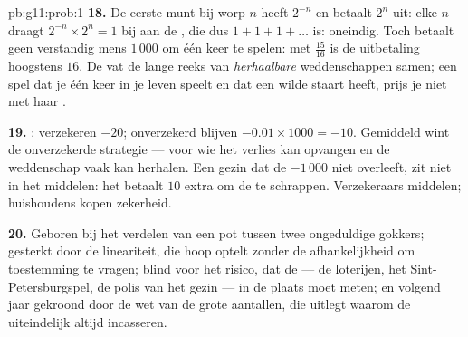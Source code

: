 \begin{solution}{pb:g11:prob:1}
\textbf{18.} De eerste munt bij worp $n$ heeft  $2^{-n}$ en betaalt
$2^n$ uit: elke $n$ draagt $2^{-n} \times 2^n = 1$ bij aan de
, die dus $1 + 1 + 1 + \dots$ is: oneindig. Toch betaalt
geen verstandig mens $1\,000$ om één keer te spelen: met 
$\frac{15}{16}$ is de uitbetaling hoogstens $16$. De  vat
de lange reeks van \emph{herhaalbare} weddenschappen samen; een spel dat je
één keer in je leven speelt en dat een wilde staart heeft, prijs je niet met
haar .

\textbf{19.} : verzekeren $-20$; onverzekerd blijven
$-0.01 \times 1000 = -10$. Gemiddeld wint de onverzekerde strategie --- voor
wie het verlies kan opvangen en de weddenschap vaak kan herhalen. Een gezin
dat de $-1\,000$ niet overleeft, zit niet in het middelen: het betaalt $10$
extra om de  te schrappen. Verzekeraars middelen; huishoudens kopen
zekerheid.

\textbf{20.} Geboren bij het verdelen van een pot tussen twee ongeduldige
gokkers; gesterkt door de lineariteit, die hoop optelt zonder de
afhankelijkheid om toestemming te vragen; blind voor het risico, dat de
 --- de loterijen, het Sint-Petersburgspel, de polis van het gezin
--- in de plaats moet meten; en volgend jaar gekroond door de wet van de
grote aantallen, die uitlegt waarom de  uiteindelijk altijd
incasseren.
\end{solution}
